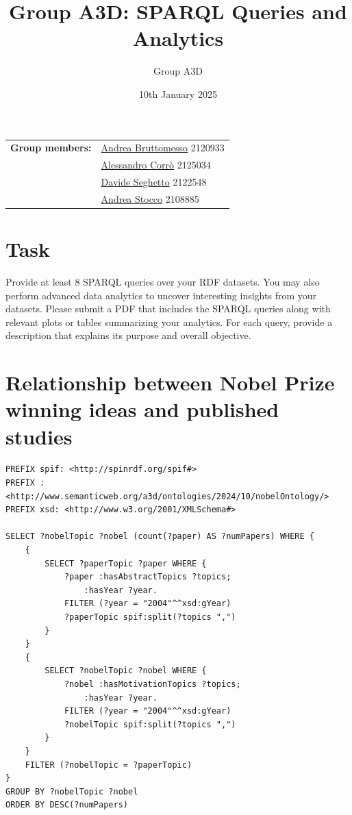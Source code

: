 \documentclass{article}
\title{Group A3D: SPARQL Queries and Analytics}
\author{Group A3D}
\date{10th January 2025}
\begin{document}
\maketitle

\begin{tabular}{@{}ll}
	\textbf{Group members:}
	 & \href{mailto:andrea.bruttomesso.1@studenti.unipd.it}{Andrea Bruttomesso} 2120933 \\
	 & \href{mailto:alessandro.corro.1@studenti.unipd.it}{Alessandro Corr\`o} 2125034   \\
	 & \href{mailto:davide.seghetto@studenti.unipd.it}{Davide Seghetto} 2122548         \\
	 & \href{mailto:andrea.stocco.8@studenti.unipd.it}{Andrea Stocco} 2108885           \\
\end{tabular}


\section*{Task}
Provide at least 8 SPARQL queries over your RDF datasets. You may also perform advanced data analytics to uncover interesting insights from your datasets.
Please submit a PDF that includes the SPARQL queries along with relevant plots or tables summarizing your analytics.
For each query, provide a description that explains its purpose and overall objective.

\section{Relationship between Nobel Prize winning ideas and published studies}
\begin{lstlisting}
PREFIX spif: <http://spinrdf.org/spif#>
PREFIX : <http://www.semanticweb.org/a3d/ontologies/2024/10/nobelOntology/>
PREFIX xsd: <http://www.w3.org/2001/XMLSchema#>

SELECT ?nobelTopic ?nobel (count(?paper) AS ?numPapers) WHERE {
    {
        SELECT ?paperTopic ?paper WHERE {
            ?paper :hasAbstractTopics ?topics;
               	:hasYear ?year.
            FILTER (?year = "2004"^^xsd:gYear)
            ?paperTopic spif:split(?topics ",")
        }
    }
    {
        SELECT ?nobelTopic ?nobel WHERE {
            ?nobel :hasMotivationTopics ?topics;
                :hasYear ?year.
            FILTER (?year = "2004"^^xsd:gYear)
            ?nobelTopic spif:split(?topics ",")
        }
    }
    FILTER (?nobelTopic = ?paperTopic)
}
GROUP BY ?nobelTopic ?nobel
ORDER BY DESC(?numPapers)
\end{lstlisting}
\end{document}
